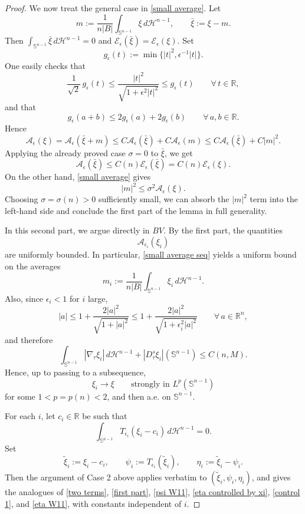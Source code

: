 \documentclass[reqno,11pt]{amsart}
\def\sz{\sigma}
\numberwithin{equation}{section}
\theoremstyle{remark}
\begin{document}
\begin{proof}
\medskip
We now treat the general case in \eqref{small average}. Let
$$
m:=\frac{1}{n|B|}\int_{\mathbb S^{n-1}}\xi\,d\mathscr H^{n-1},
\qquad
\bar\xi:=\xi-m.
$$
Then $\int_{\mathbb S^{n-1}}\bar\xi\,d\mathscr H^{n-1}=0$ and $\mathcal E_\epsilon(\bar\xi)=\mathcal E_\epsilon(\xi)$.
Set
$$
g_\epsilon(t):=\min\{|t|^2,\epsilon^{-1}|t|\}.
$$
One easily checks that
$$
\frac1{\sqrt2}\,g_\epsilon(t)\le \frac{|t|^2}{\sqrt{1+\epsilon^2|t|^2}}\le g_\epsilon(t)
\qquad\forall\, t\in\mathbb R,
$$
and that
$$
g_\epsilon(a+b)\le 2g_\epsilon(a)+2g_\epsilon(b)\qquad\forall\, a,b\in\mathbb R.
$$
Hence
$$
\mathcal A_\epsilon(\xi)=\mathcal A_\epsilon(\bar\xi+m)\le C \mathcal A_\epsilon(\bar\xi)+C \mathcal A_\epsilon(m)\le C \mathcal A_\epsilon(\bar\xi)+C |m|^2.
$$
Applying the already proved case $\sz=0$ to $\bar\xi$, we get
$$
\mathcal A_\epsilon(\bar\xi)\le C(n)\mathcal E_\epsilon(\bar\xi)=C(n)\mathcal E_\epsilon(\xi).
$$
On the other hand, \eqref{small average} gives
$$
|m|^2\le \sz^2 \mathcal A_\epsilon(\xi).
$$
Choosing $\sz=\sz(n)>0$ sufficiently small, we can absorb the $|m|^2$ term into the left-hand side and conclude the first part of the lemma in full generality.


\medskip

 In this second part, we argue directly in $BV$.
By the first part, the quantities
$$
\mathcal  A_{\epsilon_i}(\xi_i)
$$
are uniformly bounded. In particular, \eqref{small average seq} yields a uniform bound on the averages
$$
m_i:=\frac{1}{n|B|}\int_{\mathbb S^{n-1}}\xi_i\,d\mathscr H^{n-1}.
$$
Also, since $\epsilon_i<1$ for $i$ large,
$$
|a|\le 1+\frac{2|a|^2}{\sqrt{1+|a|^2}}
\le 1+\frac{2|a|^2}{\sqrt{1+\epsilon_i^2|a|^2}}
\qquad\forall\, a\in\mathbb R^n,
$$
and therefore
$$
\int_{\mathbb S^{n-1}} |\nabla_\tau \xi_i|\,d\mathscr H^{n-1}
+|D^s_\tau \xi_i|(\mathbb S^{n-1})
\le C(n,M).
$$
Hence, up to passing to a subsequence,
$$
\xi_i\to \xi \qquad\text{strongly in }L^p(\mathbb S^{n-1})
$$
for some $1<p=p(n)<2$, and then a.e. on $\mathbb S^{n-1}$.

For each $i$, let $c_i\in\mathbb R$ be such that
$$
\int_{\mathbb S^{n-1}} T_{\epsilon_i}(\xi_i-c_i)\,d\mathscr H^{n-1}=0.
$$
Set
$$
\tilde\xi_i:=\xi_i-c_i,\qquad
\psi_i:=T_{\epsilon_i}(\tilde\xi_i),\qquad
\eta_i:=\tilde\xi_i-\psi_i.
$$
Then the argument of Case 2 above applies verbatim to $(\tilde\xi_i,\psi_i,\eta_i)$, and gives the analogues of \eqref{two terms}, \eqref{first part}, \eqref{psi W11}, \eqref{eta controlled by xi}, \eqref{control 1}, and \eqref{eta W11}, with constants independent of $i$.


\end{proof}
\end{document}
